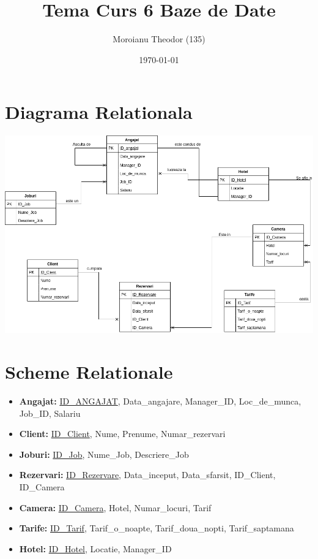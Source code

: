 \documentclass[a4paper,12pt]{article}
\begin{document}
	
	\title{Tema Curs 6 Baze de Date}
	\author{Moroianu Theodor (135)}
	\date{\today}
	\maketitle

	\section{Diagrama Relationala\newline}
	
	\includegraphics[scale=0.5]{diagrama_tema_6_curs.png}
	
	\newpage
	
	\section{Scheme Relationale}
	
	\begin{itemize}
		\item \textbf{Angajat:} \underline{ID\_ANGAJAT}, Data\_angajare, Manager\_ID, Loc\_de\_munca, Job\_ID, Salariu
		\item \textbf{Client:} \underline{ID\_Client}, Nume, Prenume, Numar\_rezervari
		\item \textbf{Joburi:} \underline{ID\_Job}, Nume\_Job, Descriere\_Job
		\item \textbf{Rezervari:} \underline{ID\_Rezervare}, Data\_inceput, Data\_sfarsit, ID\_Client, ID\_Camera
		\item \textbf{Camera:} \underline{ID\_Camera}, Hotel, Numar\_locuri, Tarif
		\item \textbf{Tarife:} \underline{ID\_Tarif}, Tarif\_o\_noapte, Tarif\_doua\_nopti, Tarif\_saptamana
		\item \textbf{Hotel:} \underline{ID\_Hotel}, Locatie, Manager\_ID
	\end{itemize}
	
\end{document}

